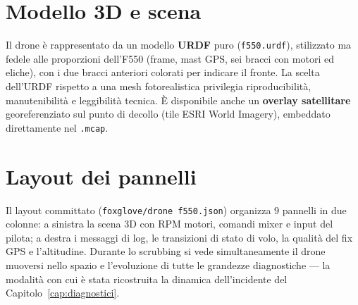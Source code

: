 
\section{Modello 3D e scena}

Il drone \`e rappresentato da un modello \textbf{URDF} puro
(\texttt{f550.urdf}), stilizzato ma fedele alle proporzioni dell'F550 (frame,
mast GPS, sei bracci con motori ed eliche), con i due bracci anteriori colorati
per indicare il fronte. La scelta dell'URDF rispetto a una mesh fotorealistica
privilegia riproducibilit\`a, manutenibilit\`a e leggibilit\`a tecnica. \`E
disponibile anche un \textbf{overlay satellitare} georeferenziato sul punto di
decollo (tile ESRI World Imagery), embeddato direttamente nel \texttt{.mcap}.

\section{Layout dei pannelli}

Il layout committato (\texttt{foxglove/drone f550.json}) organizza 9 pannelli in
due colonne: a sinistra la scena 3D con RPM motori, comandi mixer e input del
pilota; a destra i messaggi di log, le transizioni di stato di volo, la qualit\`a
del fix GPS e l'altitudine. Durante lo scrubbing si vede simultaneamente il drone
muoversi nello spazio e l'evoluzione di tutte le grandezze diagnostiche --- la
modalit\`a con cui \`e stata ricostruita la dinamica dell'incidente del
Capitolo~\ref{cap:diagnostici}.


